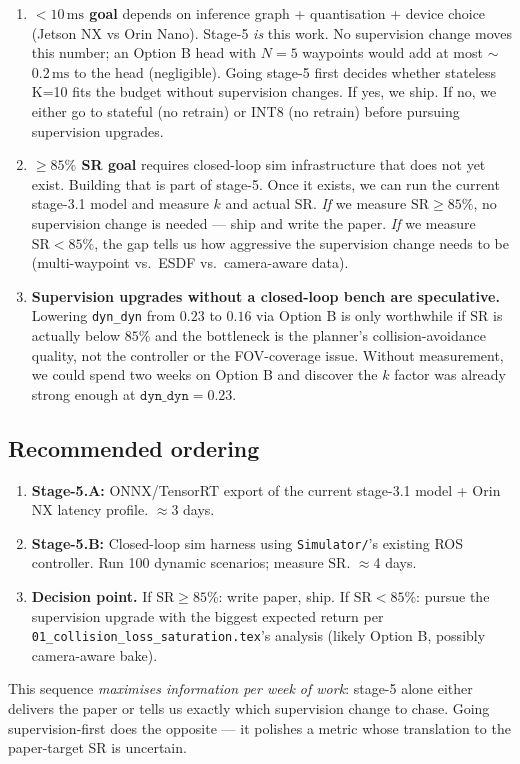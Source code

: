 \documentclass[11pt]{article}
\newcommand{\ms}{\,\text{ms}}
\begin{document}
\begin{enumerate}
  \item \textbf{$<10\ms$ goal} depends on inference graph + quantisation +
        device choice (Jetson NX vs Orin Nano). Stage-5 \emph{is} this work.
        No supervision change moves this number; an Option B head with $N=5$
        waypoints would add at most $\sim$$0.2\ms$ to the head (negligible).
        Going stage-5 first decides whether stateless K=10 fits the budget
        without supervision changes. If yes, we ship. If no, we either go to
        stateful (no retrain) or INT8 (no retrain) before pursuing supervision
        upgrades.

  \item \textbf{$\geq 85\%$ SR goal} requires closed-loop sim infrastructure
        that does not yet exist. Building that is part of stage-5. Once it
        exists, we can run the current stage-3.1 model and measure $k$ and
        actual $\text{SR}$. \emph{If} we measure $\text{SR} \geq 85\%$, no
        supervision change is needed --- ship and write the paper.
        \emph{If} we measure $\text{SR} < 85\%$, the gap tells us how
        aggressive the supervision change needs to be (multi-waypoint vs.\
        ESDF vs.\ camera-aware data).

  \item \textbf{Supervision upgrades without a closed-loop bench are
        speculative.} Lowering \texttt{dyn\_dyn} from $0.23$ to $0.16$ via
        Option B is only worthwhile if $\text{SR}$ is actually below $85\%$
        and the bottleneck is the planner's collision-avoidance quality, not
        the controller or the FOV-coverage issue. Without measurement, we
        could spend two weeks on Option B and discover the $k$ factor was
        already strong enough at $\texttt{dyn\_dyn} = 0.23$.
\end{enumerate}

\subsection{Recommended ordering}

\begin{enumerate}
  \item \textbf{Stage-5.A:} ONNX/TensorRT export of the current stage-3.1
        model + Orin NX latency profile. $\approx$3 days.
  \item \textbf{Stage-5.B:} Closed-loop sim harness using \texttt{Simulator/}'s
        existing ROS controller. Run 100 dynamic scenarios; measure $\text{SR}$.
        $\approx$4 days.
  \item \textbf{Decision point.} If $\text{SR} \geq 85\%$: write paper, ship.
        If $\text{SR} < 85\%$: pursue the supervision upgrade with the
        biggest expected return per
        \texttt{01\_collision\_loss\_saturation.tex}'s analysis (likely
        Option B, possibly camera-aware bake).
\end{enumerate}

This sequence \emph{maximises information per week of work}: stage-5 alone
either delivers the paper or tells us exactly which supervision change to
chase. Going supervision-first does the opposite --- it polishes a metric
whose translation to the paper-target SR is uncertain.
\end{document}
